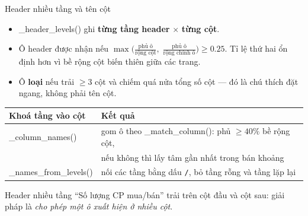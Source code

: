 \documentclass[aspectratio=169,11pt]{beamer}
\newcommand{\src}[1]{{\footnotesize\ttfamily #1}}
\begin{document}
\begin{frame}{Header nhiều tầng và tên cột}
  \begin{itemize}\small
    \item \src{\_header\_levels()} ghi \textbf{từng tầng header} $\times$ \textbf{từng cột}.
    \item Ô header được nhận nếu
      $\max\!\big(\tfrac{\text{phủ ô}}{\text{rộng cột}},\; \tfrac{\text{phủ ô}}{\text{rộng chính ô}}\big) \ge 0.25$.
      Tỉ lệ thứ hai ổn định hơn vì bề rộng cột biến thiên giữa các trang.
    \item Ô \textbf{loại} nếu trải $\ge 3$ cột và chiếm quá nửa tổng số cột —
          đó là chú thích đặt ngang, không phải tên cột.
  \end{itemize}
  \vspace{0.3em}
  \centering
  {\footnotesize
  \begin{tabular}{@{}l l@{}}
    \toprule
    \textbf{Khoá tầng vào cột} & \textbf{Kết quả} \\
    \midrule
    \src{\_column\_names()} & gom ô theo \src{\_match\_column()}: phủ $\ge 40\%$ bề rộng cột, \\
                              & nếu không thì lấy tâm gần nhất trong bán khoảng \\
    \src{\_names\_from\_levels()} & nối các tầng bằng dấu \texttt{/}, bỏ tầng rỗng và tầng lặp lại \\
    \bottomrule
  \end{tabular}}
  \vspace{0.4em}
  {\footnotesize
  Header nhiều tầng ``Số lượng CP mua/bán'' trải trên cột đầu và cột sau:
  giải pháp là \emph{cho phép một ô xuất hiện ở nhiều cột}.}
\end{frame}
\end{document}
